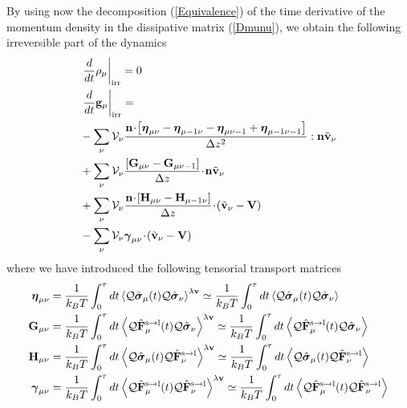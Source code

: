 \documentclass[b5paper,openright,11pt]{book}
\newcommand{\esc}{\!\cdot\!}
\begin{document}
By  using  now  the  decomposition  (\ref{Equivalence})  of  the  time
derivative  of   the  momentum  density  in   the  dissipative  matrix
(\ref{Dmunu}),  we  obtain  the  following irreversible  part  of  the
dynamics
\begin{align}
&\left.\frac{d}{dt}\rho_\mu\right|_{\rm irr}= 0
\nonumber\\
&\left.\frac{d}{dt}{\bf g}_\mu\right|_{\rm irr}=
\nonumber\\
&-\sum_{\nu}{\cal V}_\nu \frac{{\bf n}\esc\left[\boldsymbol{\eta}_{\mu\nu}-\boldsymbol{\eta}_{\mu-1\nu}-\boldsymbol{\eta}_{\mu\nu-1}+\boldsymbol{\eta}_{\mu-1\nu-1}\right]}{\Delta z^2}:{\bf n}\tilde{\bf v}_\nu
\nonumber\\
&+\sum_{\nu}{\cal V}_\nu\frac{\left[{\bf G}_{\mu\nu}-{\bf G}_{\mu\nu-1}\right]}{\Delta z}\esc{\bf n}\tilde{\bf v}_\nu
\nonumber\\
&+\sum_{\nu}{\cal V}_\nu\frac{{\bf n}\esc\left[{\bf H}_{\mu\nu}-{\bf H}_{\mu-1\nu}\right]}{\Delta z}\esc(\tilde{\bf v}_\nu-{\bf V})
\nonumber\\
&-\sum_{\nu}{\cal V}_\nu\boldsymbol{\gamma}_{\mu\nu}\esc(\tilde{\bf v}_\nu-{\bf V})
\label{Irr-Fin}
\end{align}
where we have introduced the following tensorial transport matrices
\begin{align}
\boldsymbol{\eta}_{\mu\nu}
&=\frac{1}{k_BT}\int_0^{\tau} dt
\left\langle {\cal Q}\hat{\boldsymbol{\sigma}}_{\mu}(t){\cal Q}\hat{\boldsymbol{\sigma}}_{\nu}
\right\rangle^{\lambda{\bf v}}
\simeq\frac{1}{k_BT}\int_0^{\tau} dt
\left\langle {\cal Q}\hat{\boldsymbol{\sigma}}_{\mu}(t){\cal Q}\hat{\boldsymbol{\sigma}}_{\nu}
\right\rangle
\nonumber\\
{\bf G}_{\mu\nu}
&=\frac{1}{k_BT}\int_0^{\tau} dt
\left\langle{\cal Q}\hat{\bf F}^{\rm s\to l}_\mu(t)
{\cal Q}\hat{\boldsymbol{\sigma}}_\nu
\right\rangle^{\lambda{\bf v}}
\simeq\frac{1}{k_BT}\int_0^{\tau} dt
\left\langle{\cal Q}\hat{\bf F}^{\rm s\to l}_\mu(t)
{\cal Q}\hat{\boldsymbol{\sigma}}_\nu
\right\rangle
\nonumber\\
{\bf H}_{\mu\nu}&=
\frac{1}{k_BT}\int_0^{\tau} dt
\left\langle{\cal Q}\hat{\boldsymbol{\sigma}}_\mu(t){\cal Q}\hat{\bf F}^{\rm s\to l}_\nu\right\rangle^{\lambda{\bf v}}
\simeq\frac{1}{k_BT}\int_0^{\tau} dt
\left\langle{\cal Q}\hat{\boldsymbol{\sigma}}_\mu(t){\cal Q}\hat{\bf F}^{\rm s\to l}_\nu\right\rangle
\nonumber\\
\boldsymbol{\gamma}_{\mu\nu}
&=\frac{1}{k_BT}\int_0^{\tau} dt
\left\langle 
{\cal Q}\hat{\bf F}^{\rm s\to l}_\mu(t)
{\cal Q}\hat{\bf F}^{\rm s\to l}_\nu\right\rangle^{\lambda{\bf v}}
\simeq\frac{1}{k_BT}\int_0^{\tau} dt
\left\langle 
{\cal Q}\hat{\bf F}^{\rm s\to l}_\mu(t)
{\cal Q}\hat{\bf F}^{\rm s\to l}_\nu\right\rangle
\label{MolTransportCoeff}
\end{align}
\end{document}
